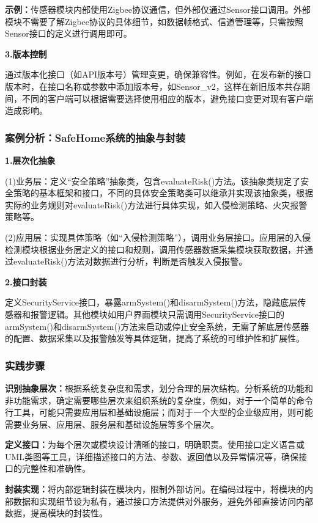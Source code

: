 \textbf{示例：}传感器模块内部使用Zigbee协议通信，但外部仅通过Sensor接口调用。外部模块不需要了解Zigbee协议的具体细节，如数据帧格式、信道管理等，只需按照Sensor接口的定义进行调用即可。

\textbf{3.版本控制}

通过版本化接口（如API版本号）管理变更，确保兼容性。例如，在发布新的接口版本时，在接口名称或参数中添加版本号，如Sensor\_v2，这样在新旧版本共存期间，不同的客户端可以根据需要选择使用相应的版本，避免接口变更对现有客户端造成影响。

\subsubsection{案例分析：SafeHome系统的抽象与封装}

\textbf{1.层次化抽象}

(1)业务层：定义``安全策略''抽象类，包含evaluateRisk()方法。该抽象类规定了安全策略的基本框架和接口，不同的具体安全策略类可以继承并实现该抽象类，根据实际的业务规则对evaluateRisk()方法进行具体实现，如入侵检测策略、火灾报警策略等。

(2)应用层：实现具体策略（如``入侵检测策略''），调用业务层接口。应用层的入侵检测模块根据业务层定义的接口和规则，调用传感器数据采集模块获取数据，并通过evaluateRisk()方法对数据进行分析，判断是否触发入侵报警。

\textbf{2.接口封装}

定义SecurityService接口，暴露armSystem()和disarmSystem()方法，隐藏底层传感器和报警逻辑。其他模块如用户界面模块只需调用SecurityService接口的armSystem()和disarmSystem()方法来启动或停止安全系统，无需了解底层传感器的配置、数据采集以及报警触发等具体逻辑，提高了系统的可维护性和扩展性。

\subsubsection{实践步骤}

\textbf{识别抽象层次：}根据系统复杂度和需求，划分合理的层次结构。分析系统的功能和非功能需求，确定需要哪些层次来组织系统的复杂度，例如，对于一个简单的命令行工具，可能只需要应用层和基础设施层；而对于一个大型的企业级应用，则可能需要业务层、应用层、服务层和基础设施层等多个层次。

\textbf{定义接口：}为每个层次或模块设计清晰的接口，明确职责。使用接口定义语言或UML类图等工具，详细描述接口的方法、参数、返回值以及异常情况等，确保接口的完整性和准确性。

\textbf{封装实现：}将内部逻辑封装在模块内，限制外部访问。在编码过程中，将模块的内部数据和实现细节设为私有，通过接口方法提供对外服务，避免外部直接访问内部数据，提高模块的封装性。

